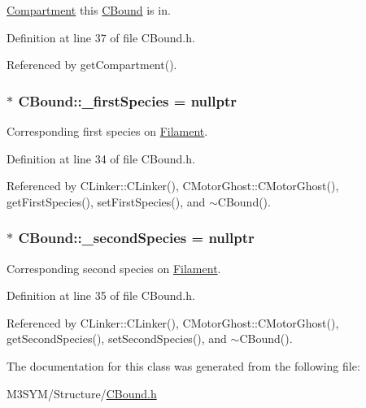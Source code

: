 \hyperlink{classCompartment}{Compartment} this \hyperlink{classCBound}{C\+Bound} is in. 



Definition at line 37 of file C\+Bound.\+h.



Referenced by get\+Compartment().

\hypertarget{classCBound_a7ee4f44fd39c414be1f7b74b1031c1ce}{
\subsubsection[{\+\_\+first\+Species}]{$\ast$ C\+Bound\+::\+\_\+first\+Species = nullptr\hspace{0.3cm}{\ttfamily [protected]}}}\label{classCBound_a7ee4f44fd39c414be1f7b74b1031c1ce}


Corresponding first species on \hyperlink{classFilament}{Filament}. 



Definition at line 34 of file C\+Bound.\+h.



Referenced by C\+Linker\+::\+C\+Linker(), C\+Motor\+Ghost\+::\+C\+Motor\+Ghost(), get\+First\+Species(), set\+First\+Species(), and $\sim$\+C\+Bound().

\hypertarget{classCBound_ae6818ab861d273598a2507be75183e41}{
\subsubsection[{\+\_\+second\+Species}]{$\ast$ C\+Bound\+::\+\_\+second\+Species = nullptr\hspace{0.3cm}{\ttfamily [protected]}}}\label{classCBound_ae6818ab861d273598a2507be75183e41}


Corresponding second species on \hyperlink{classFilament}{Filament}. 



Definition at line 35 of file C\+Bound.\+h.



Referenced by C\+Linker\+::\+C\+Linker(), C\+Motor\+Ghost\+::\+C\+Motor\+Ghost(), get\+Second\+Species(), set\+Second\+Species(), and $\sim$\+C\+Bound().



The documentation for this class was generated from the following file\+:\begin{DoxyCompactItemize}
\item 
M3\+S\+Y\+M/\+Structure/\hyperlink{CBound_8h}{C\+Bound.\+h}\end{DoxyCompactItemize}
